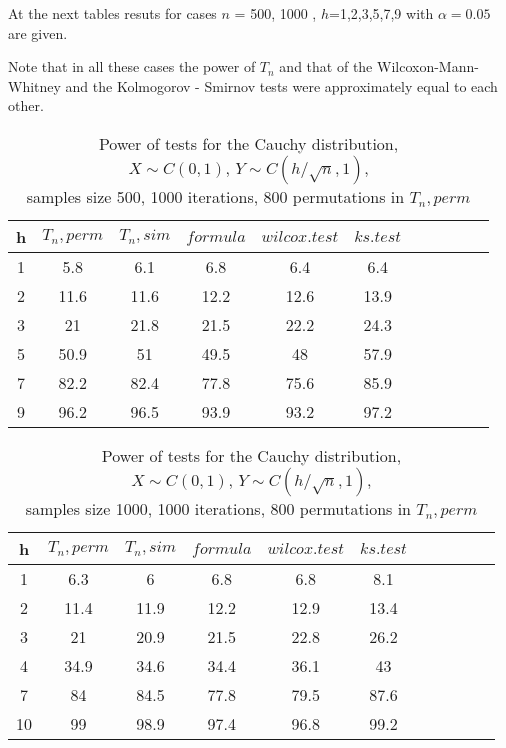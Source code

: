 \documentclass[final,11pt,3p]{elsarticle}
\begin{document}
 At the next tables resuts for cases $n$ = 500, 1000 , $h$=1,2,3,5,7,9 with $\alpha=0.05$ are given.


Note that in all these cases the power of  $T_n$ and  that of the Wilcoxon-Mann-Whitney and the
Kolmogorov - Smirnov tests were approximately equal to each other.



\begin{longtable}{|c|c|c|c|c|c|c|c|c|c|c|}
  \caption{Power of tests for the Cauchy distribution, \\
           $X\sim C(0,1)$, $Y\sim C(h/\sqrt{n},1)$, \\
           samples size 500, 1000 iterations, 800 permutations in $T_n, perm$} \\
  \hline
  h & $T_n, perm$ & $T_n, sim$ & $formula$ & $wilcox.test$ & $ks.test$ \\ \hline
  1 & 5.8   & 6.1      & 6.8       & 6.4           & 6.4       \\
  2 & 11.6  & 11.6     & 12.2      & 12.6          & 13.9      \\
  3 & 21    & 21.8     & 21.5      & 22.2          & 24.3      \\
  5 & 50.9  & 51       & 49.5      & 48            & 57.9      \\
  7 & 82.2  & 82.4     & 77.8      & 75.6          & 85.9      \\
  9 & 96.2  & 96.5     & 93.9      & 93.2          & 97.2      \\ \hline
\end{longtable}

\begin{longtable}{|c|c|c|c|c|c|c|c|c|c|c|}
  \caption{Power of tests for the Cauchy distribution, \\
           $X\sim C(0,1)$, $Y\sim C(h/\sqrt{n},1)$, \\
           samples size 1000, 1000 iterations, 800 permutations in $T_n, perm$} \\
  \hline
  h  & $T_n, perm$ & $T_n, sim$ & $formula$ & $wilcox.test$ & $ks.test$ \\ \hline
  1  & 6.3   & 6        & 6.8       & 6.8           & 8.1       \\
  2  & 11.4  & 11.9     & 12.2      & 12.9          & 13.4      \\
  3  & 21    & 20.9     & 21.5      & 22.8          & 26.2      \\
  4  & 34.9  & 34.6     & 34.4      & 36.1          & 43        \\
  7  & 84    & 84.5     & 77.8      & 79.5          & 87.6      \\
  10 & 99    & 98.9     & 97.4      & 96.8          & 99.2      \\ \hline
\end{longtable}
\end{document}
